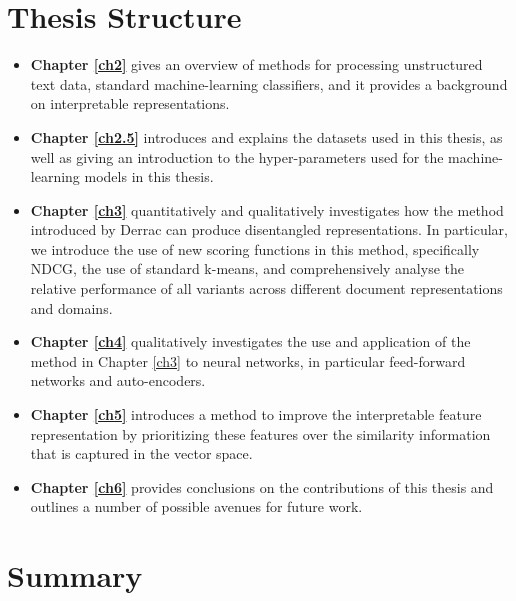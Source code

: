 

\section{Thesis Structure} \label{ch1:ths}

\begin{itemize}
	\item \textbf{Chapter \ref{ch2}} gives an overview of methods for processing unstructured text data, standard machine-learning classifiers, and it provides a background on interpretable representations.
	\item \textbf{Chapter \ref{ch2.5}} introduces and explains the datasets used in this thesis, as well as giving an introduction to the hyper-parameters  used for the machine-learning models in this thesis.
	\item \textbf{Chapter \ref{ch3}} quantitatively and qualitatively investigates how the method introduced by Derrac \cite{Derrac2015} can produce disentangled representations. In particular, we introduce the use of new scoring functions in this method, specifically NDCG, the use of standard k-means,  and comprehensively analyse the relative performance of all variants across different document representations and domains. 
	\item \textbf{Chapter \ref{ch4}} qualitatively investigates the use and application of the method in Chapter \ref{ch3} to neural networks, in particular feed-forward networks and auto-encoders.
	\item \textbf{Chapter \ref{ch5}} introduces a  method to improve the interpretable feature representation by prioritizing these features over the similarity information that is captured in the vector space.
	\item \textbf{Chapter \ref{ch6}} provides conclusions on the contributions of this thesis and outlines a number of possible avenues for future work.
\end{itemize}


\section{Summary}

